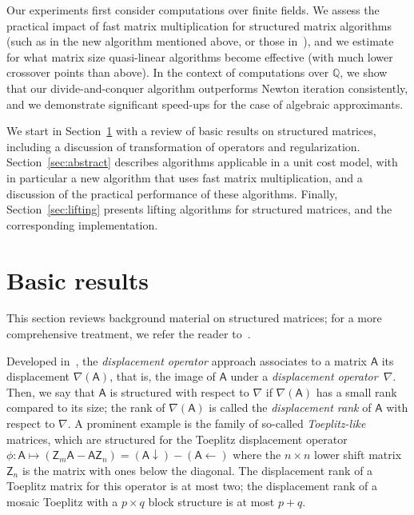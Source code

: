 \documentclass[sigconf]{acmart}
\newcommand{\mA}{\ensuremath{\mathsf{A}}}
\newcommand{\mZ}{\ensuremath{\mathsf{Z}}}
\newcommand{\Q}{\ensuremath{\mathbb{Q}}}
\theoremstyle{acmdefinition}
\begin{document}
Our experiments first consider computations over finite fields.  We
assess the practical impact of fast matrix multiplication for
structured matrix algorithms (such as in the new algorithm mentioned
above, or those in~\cite{BoJeSc08,BoJeMoSc16}), and we estimate for
what matrix size quasi-linear algorithms become effective (with much
lower crossover points than above). In the context of computations
over $\Q$, we show that our divide-and-conquer algorithm outperforms
Newton iteration consistently, and we demonstrate significant
speed-ups for the case of algebraic approximants.

We start in Section~\ref{sec:basics} with a review of basic results on
structured matrices, including a discussion of transformation of
operators and regularization. Section~\ref{sec:abstract} describes
algorithms applicable in a unit cost model, with in particular a new
algorithm that uses fast matrix multiplication, and a discussion of
the practical performance of these algorithms. Finally,
Section~\ref{sec:lifting} presents lifting algorithms for structured
matrices, and the corresponding implementation.


\vspace{-6px}
\section{Basic results}\label{sec:basics}

This section reviews background material on structured matrices; for a
more comprehensive treatment, we refer the reader to~\cite{Pan01}.

{}  Developed
in~\cite{KaKuMo79}, the {\it displacement operator} approach
associates to a matrix $\mA$ its displacement $\nabla(\mA)$, that is, the
image of $\mA$ under a \textit{displacement operator}~$\nabla$.  Then,
we say that $\mA$ is structured with respect to $\nabla$ if $\nabla(\mA)$
has a small rank compared to its size; the rank of $\nabla(\mA)$ is
called the \textit{displacement rank} of $\mA$ with respect to
$\nabla$. A prominent example is the family of so-called {\em
  Toeplitz-like} matrices, which are structured for the Toeplitz
displacement operator
$  \phi: \mA \mapsto \left( \mZ_m \mA - \mA \mZ_n \right) = 
                        (\mA \downarrow) - (\mA \leftarrow)
$
where the $n \times n$ lower shift matrix $\mZ_n$ is the matrix
with ones below the diagonal.  The displacement rank of a Toeplitz
matrix for this operator is at most two; the displacement rank of a
mosaic Toeplitz with a $p \times q$ block structure is at most $p+q$.
\end{document}
